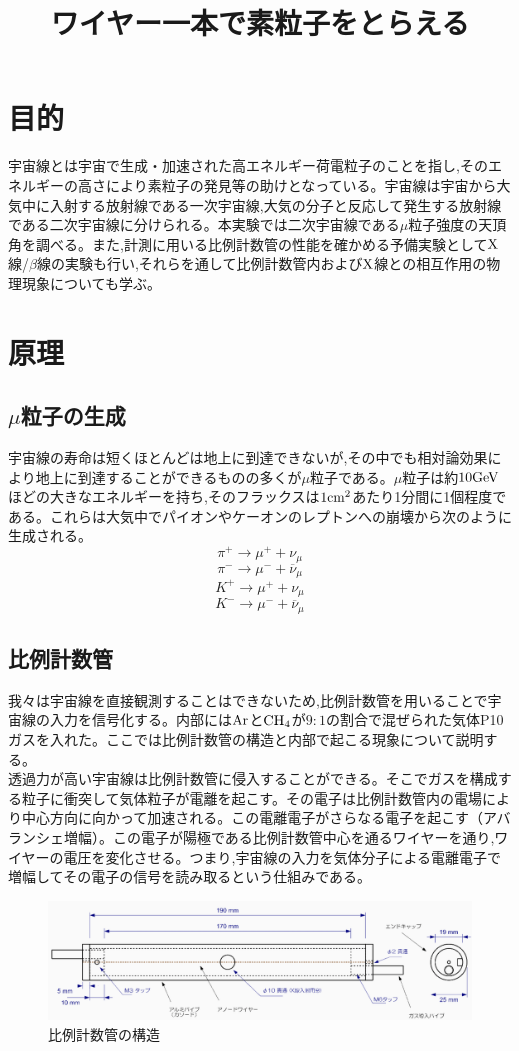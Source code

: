 \documentclass[a4j]{jsarticle}
\title{ワイヤー一本で素粒子をとらえる}
\date{}
\begin{document}
\maketitle 

\section{目的}
宇宙線とは宇宙で生成・加速された高エネルギー荷電粒子のことを指し,そのエネルギーの高さにより素粒子の発見等の助けとなっている。宇宙線は宇宙から大気中に入射する放射線である一次宇宙線,大気の分子と反応して発生する放射線である二次宇宙線に分けられる。本実験では二次宇宙線である$\mu$粒子強度の天頂角を調べる。また,計測に用いる比例計数管の性能を確かめる予備実験として$\rm{X}$線/$\beta$線の実験も行い,それらを通して比例計数管内および$\rm{X}$線との相互作用の物理現象についても学ぶ。

\section{原理}
	\subsection{$\mu$粒子の生成}
	宇宙線の寿命は短くほとんどは地上に到達できないが,その中でも相対論効果により地上に到達することができるものの多くが$\mu$粒子である。$\mu$粒子は約$10\rm{GeV}$ほどの大きなエネルギーを持ち,そのフラックスは$1\rm{cm}^2$あたり1分間に1個程度である。これらは大気中でパイオンやケーオンのレプトンへの崩壊から次のように生成される。
	\[
	\pi^{+} \to \mu^{+} + \nu_{\mu}
	\]
	\[
	\pi^{-} \to \mu^{-} + \overline{\nu}_{\mu}
	\]
	\[
	K^{+} \to \mu^{+} + \nu_{\mu}
	\]
	\[
	K^{-} \to \mu^{-} + \overline{\nu}_{\mu}
	\]
	

	\subsection{比例計数管}
	我々は宇宙線を直接観測することはできないため,比例計数管を用いることで宇宙線の入力を信号化する。内部には$\rm{Ar}$と$\rm{CH_4}$が$9:1$の割合で混ぜられた気体P10ガスを入れた。ここでは比例計数管の構造と内部で起こる現象について説明する。\\
	\quad 透過力が高い宇宙線は比例計数管に侵入することができる。そこでガスを構成する粒子に衝突して気体粒子が電離を起こす。その電子は比例計数管内の電場により中心方向に向かって加速される。この電離電子がさらなる電子を起こす（アバランシェ増幅）。この電子が陽極である比例計数管中心を通るワイヤーを通り,ワイヤーの電圧を変化させる。つまり,宇宙線の入力を気体分子による電離電子で増幅してその電子の信号を読み取るという仕組みである。
	\begin{figure}[htbp]
	\centering
	\includegraphics[width=12cm]{proportionalcounter.png}
	\caption{比例計数管の構造}
	\end{figure}
	
\end{document}
